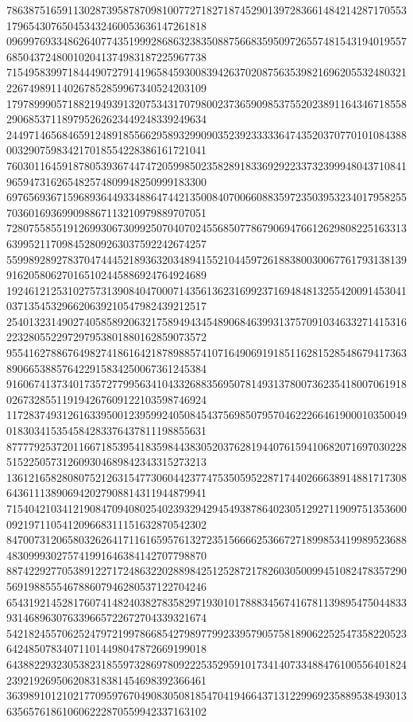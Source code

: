 \begin{DoxyCode}
      786387516591130287395878709810077271827187452901397283661484214287170553179654307650453432460053636147261818
      096997693348626407743519992868632383508875668359509726557481543194019557685043724800102041374983187225967738
      715495839971844490727914196584593008394263702087563539821696205532480321226749891140267852859967340524203109
      179789990571882194939132075343170798002373659098537552023891164346718558290685371189795262623449248339249634
      244971465684659124891855662958932990903523923333364743520370770101084388003290759834217018554228386161721041
      760301164591878053936744747205998502358289183369292233732399948043710841965947316265482574809948250999183300
      697656936715968936449334886474421350084070066088359723503953234017958255703601693699098867113210979889707051
      728075585519126993067309925070407024556850778679069476612629808225163313639952117098452809263037592242674257
      559989289278370474445218936320348941552104459726188380030067761793138139916205806270165102445886924764924689
      192461212531027573139084047000714356136231699237169484813255420091453041037135453296620639210547982439212517
      254013231490274058589206321758949434548906846399313757091034633271415316223280552297297953801880162859073572
      955416278867649827418616421878988574107164906919185116281528548679417363890665388576422915834250067361245384
      916067413734017357277995634104332688356950781493137800736235418007061918026732855119194267609122103598746924
      117283749312616339500123959924050845437569850795704622266461900010350049018303415354584283376437811198855631
      877779253720116671853954183598443830520376281944076159410682071697030228515225057312609304689842343315273213
      136121658280807521263154773060442377475350595228717440266638914881717308643611138906942027908814311944879941
      715404210341219084709408025402393294294549387864023051292711909751353600092197110541209668311151632870542302
      847007312065803262641711616595761327235156666253667271899853419989523688483099930275741991646384142707798870
      887422927705389122717248632202889842512528721782603050099451082478357290569198855546788607946280537122704246
      654319214528176074148240382783582971930101788834567416781139895475044833931468963076339665722672704339321674
      542182455706252479721997866854279897799233957905758189062252547358220523642485078340711014498047872669199018
      643882293230538231855973286978092225352959101734140733488476100556401824239219269506208318381454698392366461
      363989101210217709597670490830508185470419466437131229969235889538493013635657618610606222870559942337163102

\end{DoxyCode}
